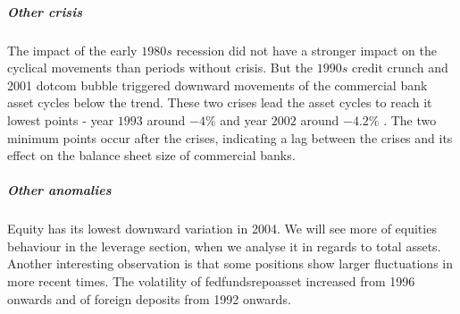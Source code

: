 \documentclass[12pt, a4paper]{article} %
\begin{document}
\subparagraph{Other crisis}
The impact of the early $1980s$ recession did not have a stronger impact on the cyclical movements than periods without crisis. But the $1990s$ credit crunch and 2001 dotcom bubble triggered downward movements of the commercial bank asset cycles below the trend. These two crises lead the asset cycles to reach it lowest points - year $1993$ around $-4\%$ and year $2002$ around $-4.2\%$ . The two minimum points occur after the crises, indicating a lag between the crises and its effect on the balance sheet size of commercial banks.

\subparagraph{Other anomalies}
Equity has its lowest downward variation in 2004. We will see more of equities behaviour in the leverage section, when we analyse it in regards to total assets.
Another interesting observation is that some positions show larger fluctuations in more recent times. The volatility of fedfundsrepoasset increased from 1996 onwards and of foreign deposits from 1992 onwards.
\end{document}
